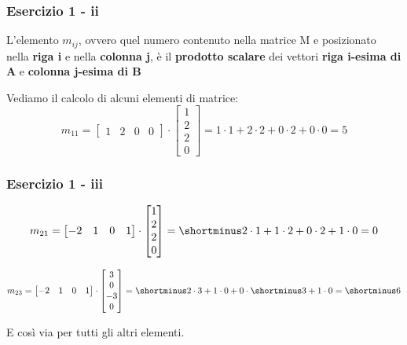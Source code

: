 \documentclass{beamer}
\begin{document}
\begin{frame}
\frametitle{Esercizio 1 - ii}

    L'elemento $m_{ij}$, ovvero quel numero contenuto nella matrice M e posizionato nella \textbf{riga i} e nella
    \textbf{colonna j}, \`e il \textbf{prodotto scalare} dei vettori \textbf{riga i-esima di A} e \textbf{colonna j-esima di B}


Vediamo il calcolo di alcuni elementi di matrice:
\begin{displaymath}
    m_{11} =
\begin{bmatrix}
    1 &  2 &  0 &  0
\end{bmatrix}
\cdot
\begin{bmatrix}
    1 \\  2 \\ 2 \\ 0
\end{bmatrix}
 = 1 \cdot 1 + 2 \cdot 2 + 0 \cdot 2 + 0 \cdot 0
 = 5
\end{displaymath}

\end{frame}

\begin{frame}
\frametitle{Esercizio 1 - iii}

\begin{displaymath}
    m_{21} =
\begin{bmatrix}
    -2 & 1 &  0 &  1
\end{bmatrix}
\cdot
\begin{bmatrix}
    1 \\  2 \\ 2 \\ 0
\end{bmatrix}
 = \shortminus 2 \cdot 1 + 1 \cdot 2 + 0 \cdot 2 + 1 \cdot 0
 = 0
\end{displaymath}


\begin{displaymath}
    m_{23} =
\begin{bmatrix}
    -2 & 1 &  0 &  1
\end{bmatrix}
\cdot
\begin{bmatrix}
    3 \\  0 \\ -3 \\ 0
\end{bmatrix}
 = \shortminus 2 \cdot 3 + 1 \cdot 0 + 0 \cdot \shortminus 3 + 1 \cdot 0
 = \shortminus 6
\end{displaymath}

E cos\`i via per tutti gli altri elementi.
\end{frame}
\end{document}
